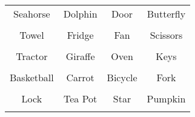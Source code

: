 \documentclass[12pt,a4paper]{article}
\begin{document}
\thispagestyle{empty}
\begin{table}[]
\centering
\Huge
\begin{tabular}{cccc}
 Seahorse& Dolphin& Door& Butterfly\\  & & & \\
 Towel& Fridge& Fan& Scissors\\  & & & \\
 Tractor& Giraffe& Oven& Keys\\  & & & \\
 Basketball& Carrot& Bicycle& Fork\\  & & & \\
 Lock& Tea Pot& Star& Pumpkin\\  & & & \\
\end{tabular}
\end{table}
\end{document}
